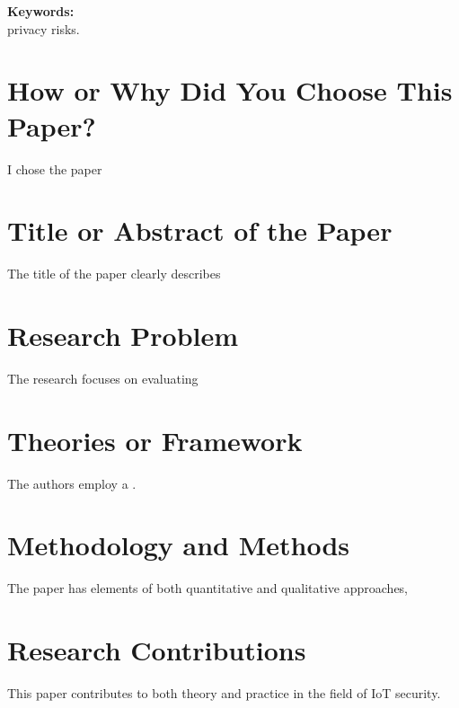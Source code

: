 \documentclass[a4paper,12pt]{article}
\begin{document}
\begin{flushleft}
\vspace{0.3cm}

\textbf{Keywords:} \\
privacy risks.

\vspace{0.5cm}

\section*{How or Why Did You Choose This Paper?}
I chose the paper \cite{paper1} 

\vspace{0.5cm}

\section*{Title or Abstract of the Paper}
The title of the paper clearly describes

\vspace{0.5cm}

\section*{Research Problem}
The research focuses on evaluating 

\vspace{0.5cm}

\section*{Theories or Framework}
The authors employ a .

\vspace{0.5cm}

\section*{Methodology and Methods}
The paper \cite{paper1} has elements of both quantitative and qualitative approaches, 


\vspace{0.5cm}

\section*{Research Contributions}
This paper contributes to both theory and practice in the field of IoT security. 

\vspace{0.5cm}


\end{flushleft}
\end{document}
